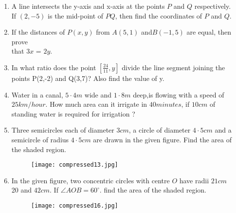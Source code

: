 \documentclass{article}
\begin{document}
\begin{enumerate}
\item A line intersects the y-axis and x-axis at the points $P$ and $Q$ respectively.\\
 If $(2,-5)$ is the mid-point of $PQ$, then find the coordinates of $P$ and $Q$.
 \item If the distances of $P(x, y)$ from $A(5, 1)$ and$B(-1, 5)$ are equal, then prove \\that $3x$ = $2y$.
 \item In what ratio does the point $[\frac{24}{11}, y]$ divide the line segment joining the \\ points P(2,-2) and Q(3,7)? Also find the value of y.
 \item Water in a canal, $5·4 m$ wide and $1·8 m$ deep,is flowing with a speed of \\ $25 km/hour$. How much area can it irrigate in $40 minutes$, if $10cm$ of \\standing water is required for irrigation ?                    
 \item Three semicircles each of diameter $3 cm$, a circle of diameter $4·5 cm$ and a semicircle of radius $4·5 cm$ are drawn in the given figure. Find the area of \\the shaded region.
 \begin{figure}[h!]
 \centering                 \texttt{[image: compressed13.jpg]}
 \end{figure}
 \item In the given figure, two concentric circles with centre $O$ have radii $21 cm$ \\
 20 and $42 cm$. If $ \angle AOB = 60^\circ $. find the area of the shaded region.
 \begin{figure}[h!]
 \centering
 \texttt{[image: compressed16.jpg]}
 \end{figure}
 \end{enumerate}
\end{document}
